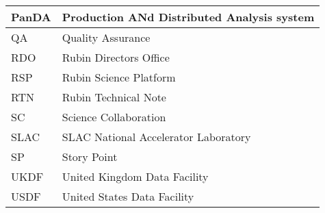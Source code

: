 \begin{longtable}{p{}p{}}
PanDA &  Production ANd Distributed Analysis system \\\hline
QA & Quality Assurance \\\hline
RDO & Rubin Directors Office \\\hline
RSP & Rubin Science Platform \\\hline
RTN & Rubin Technical Note \\\hline
SC & Science Collaboration \\\hline
SLAC & SLAC National Accelerator Laboratory \\\hline
SP & Story Point \\\hline
UKDF & United Kingdom Data Facility \\\hline
USDF & United States Data Facility \\\hline
\end{longtable}
